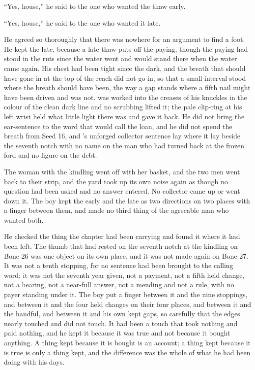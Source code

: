 “Yes, house,” he said to the one who wanted the thaw early.

“Yes, house,” he said to the one who wanted it late.

He agreed so thoroughly that there was nowhere for an argument to find a foot. He kept the late, because a late thaw puts off the paying, though the paying had stood in the ruts since the water went and would stand there when the water came again. His chest had been tight since the dark, and the breath that should have gone in at the top of the reach did not go in, so that a small interval stood where the breath should have been, the way a gap stands where a fifth nail might have been driven and was not.  was worked into the creases of his knuckles in the colour of the clean dark line and no scrubbing lifted it; the pale clip-ring at his left wrist held what little light there was and gave it back. He did not bring the ear-sentence to the word that would call the loan, and he did not spend the breath from Seed 16, and 's unforged collector sentence lay where it lay beside the seventh notch with no name on the man who had turned back at the frozen ford and no figure on the debt.

The woman with the kindling went off with her basket, and the two men went back to their strip, and the yard took up its own noise again as though no question had been asked and no answer entered. No collector came up  or went down it. The boy kept the early and the late as two directions on two places with a finger between them, and made no third thing of the agreeable man who wanted both.

\scenebreak

He checked the thing the chapter had been carrying and found it where it had been left. The thumb that had rested on the seventh notch at the kindling on Bone 26 was one object on its own place, and it was not made again on Bone 27. It was not a tenth stopping, for no sentence had been brought to the calling word; it was not the seventh year given, not a payment, not a fifth held change, not a hearing, not a near-full answer, not a mending and not a rule, with no payer standing under it. The boy put a finger between it and the nine stoppings, and between it and the four held changes on their four places, and between it and the handful, and between it and his own kept gaps, so carefully that the edges nearly touched and did not touch. It had been a touch that took nothing and paid nothing, and he kept it because it was true and not because it bought anything. A thing kept because it is bought is an account; a thing kept because it is true is only a thing kept, and the difference was the whole of what he had been doing with his days.

